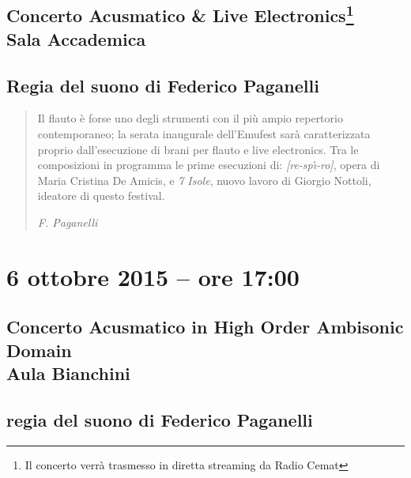 \documentclass[8pt, twoside, a5paper]{extreport}
\begin{document}
\subsection*{{\small Concerto Acusmatico \& Live Electronics\footnote{ Il concerto verrà trasmesso in diretta streaming da Radio Cemat}} \\
	\textsf{Sala Accademica}}

{\fontsize{30}{30} }

\subsection*{\textsf{Regia del suono di Federico Paganelli}}

\begin{quote}
{\svolk \small
Il flauto è forse uno degli strumenti con il più ampio repertorio contemporaneo; la serata inaugurale dell’Emufest sarà caratterizzata proprio dall’esecuzione di brani per flauto e live electronics.    
Tra le composizioni in programma le prime esecuzioni di: \emph{[re-sp\`{\i}-ro]}, opera di Maria Cristina De Amicis, e  \emph{7 Isole}, nuovo lavoro di Giorgio Nottoli, ideatore di questo festival.}

\emph{F. Paganelli}
\end{quote}


\begin{multicols}{2}




\end{multicols}

\clearpage


\section*{6 ottobre 2015 -- ore 17:00}

\subsection*{{\small Concerto Acusmatico in High Order Ambisonic Domain} \\
	\textsf{Aula Bianchini}}

{\fontsize{30}{30} }

\subsection*{\textsf{regia del suono di Federico Paganelli}}
\end{document}
